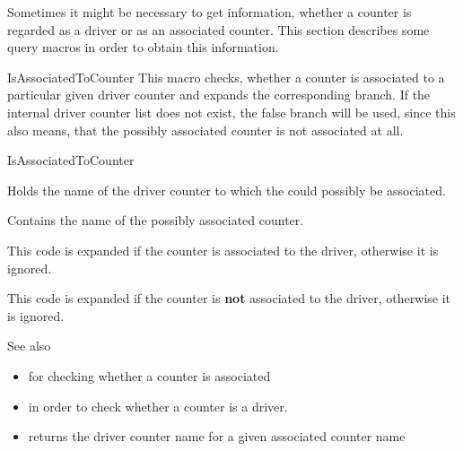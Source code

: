 \documentclass[12pt,a4paper,oneside]{article}
\begin{document}
Sometimes it might be necessary to get information, whether a counter is regarded as a driver or as an associated counter. This section describes some query macros in order to obtain this information.


\begin{docCommand}{IsAssociatedToCounter}{}
This macro checks, whether a counter is associated to a particular given driver counter and expands the corresponding branch. If the internal driver counter list does not exist, the false branch will be used, since this also means, that the possibly associated counter is not associated at all. 



\begin{docCommandArgs}{IsAssociatedToCounter}%

\begin{codeoptionsenum}
  \item {} 

    Holds the name of the driver counter to which  the could possibly be associated.
\item {}

  Contains the name of the possibly associated counter.

\item {}

  This code is expanded if the counter is associated to the driver, otherwise it is ignored.

\item {}

  This code is expanded if the counter is \textbf{not} associated to the driver, otherwise it is ignored.

\end{codeoptionsenum}
\end{docCommandArgs}


\begin{dispExample}

\end{dispExample}

See also

\begin{itemize}
  \item {} for checking whether a counter is associated 
  \item {} in order to check whether a counter is a driver. 
  \item {} returns the driver counter name for a given associated counter name
\end{itemize}


\end{docCommand}
\end{document}
